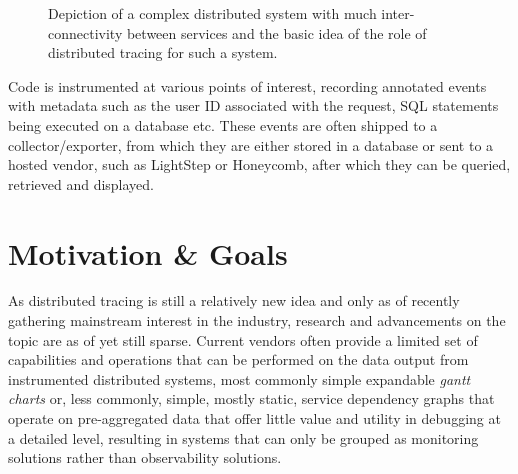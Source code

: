 \documentclass[12pt,pdftex,titlepage]{report}
\begin{document}
            \begin{figure}[hbt!]
                \centering
                \caption[Depiction of a complex distributed system]{Depiction of a complex distributed system with much inter-connectivity between services and the basic idea of the role
                of distributed tracing for such a system.}
                \label{fig:dist}
            \end{figure}

            Code is instrumented at various points of interest, recording annotated events with metadata such as the user ID associated with the request, SQL statements being 
            executed on a database etc. These events are often shipped to a collector/exporter, from which they are either stored in a database or sent to a hosted vendor, such as
            LightStep or Honeycomb, after which they can be queried, retrieved and displayed.

        \section{Motivation \& Goals}
            As distributed tracing is still a relatively new idea and only as of recently gathering mainstream interest in the industry, research and advancements on the topic are 
            as of yet still sparse. Current vendors often provide a limited set of capabilities and operations that can be performed on the data output from instrumented distributed systems,
            most commonly simple expandable \textit{gantt charts} or, less commonly, simple, mostly static, service dependency graphs that operate on pre-aggregated data that offer little 
            value and utility in debugging at a detailed level, resulting in systems that can only be grouped as monitoring solutions rather than observability solutions.
            
\end{document}

